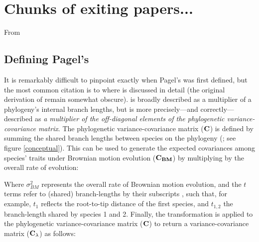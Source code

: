 \documentclass[11pt]{article}
\begin{document}
\section*{Chunks of exiting papers...}

From \cite{pearse2025define}

\subsection*{Defining Pagel's \lam}
It is remarkably difficult to pinpoint exactly when Pagel's \lam was first defined, but the most common citation is to \textcite{Pagel1999} where \lam is discussed in detail (the original  derivation of \lam remain somewhat obscure). \lam is broadly described as a multiplier of a phylogeny's internal branch lengths, but is more precisely---and correctly---described as \emph{a multiplier of the off-diagonal elements of the phylogenetic variance-covariance matrix}. The phylogenetic variance-covariance matrix ($\bf C$) is defined by summing the shared branch lengths between species on the phylogeny (; see figure \ref{conceptual}). This can be used to generate the expected covariances among species' traits under Brownian motion evolution ($\bf C_{BM}$) by multiplying by the overall rate of evolution:


Where $\sigma^2_{BM}$ represents the overall rate of Brownian motion evolution, and the $t$ terms refer to (shared) branch-lengths by their subscripts , such that, for example, $t_1$ reflects the root-to-tip distance of the first species, and $t_{1,2}$ the branch-length shared by species 1 and 2.  Finally, the \lam transformation is applied to the phylogenetic variance-covariance matrix (${\bf C}$) to return a variance-covariance matrix (${\bf C_\lambda}$) as follows:
\end{document}
